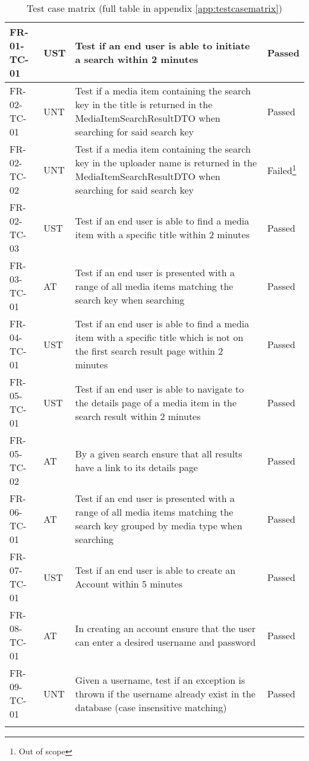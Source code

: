 \documentclass[../report.tex]{subfiles}
\begin{document}
\begin{longtable}{|L{2.1cm}|L{0.8cm}|L{9cm}|L{1.2cm}|}
FR-01-TC-01 & UST & Test if an end user is able to initiate a search within 2 minutes & Passed  \\ \hline
FR-02-TC-01& UNT& Test if a media item containing the search key in the title is returned in the MediaItemSearchResultDTO when searching for said search key& Passed  \\ \hline
FR-02-TC-02& UNT& Test if a media item containing the search key in the uploader name is returned in the MediaItemSearchResultDTO when searching for said search key& Failed\footnote{Out of scope}  \\ \hline
FR-02-TC-03&UST&Test if an end user is able to find a media item with a specific title within 2 minutes&Passed  \\ \hline
FR-03-TC-01&AT&Test if an end user is presented with a range of all media items matching the search key when searching &Passed  \\ \hline
FR-04-TC-01&UST&Test if an end user is able to find a media item with a specific title which is not on the first search result page within 2 minutes&Passed  \\ \hline
FR-05-TC-01&UST&Test if an end user is able to navigate to the details page of a media item in the search result within 2 minutes&Passed  \\ \hline
FR-05-TC-02&AT&By a given search ensure that all results have a link to its details page&Passed  \\ \hline
FR-06-TC-01&AT&Test if an end user is presented with a range of all media items matching the search key grouped by media type when searching &Passed  \\ \hline
FR-07-TC-01&UST&Test if an end user is able to create an Account within 5 minutes&Passed  \\ \hline
FR-08-TC-01&AT&In creating an account ensure that the user can enter a desired username and password&Passed  \\ \hline
FR-09-TC-01&UNT&Given a username, test if an exception is thrown if the username already exist in the database (case insensitive matching)&Passed  \\ \hline

\captionsetup{belowskip=10pt}

\caption{\label{tab:testcasematrix} Test case matrix (full table in appendix \ref{app:testcasematrix})}

\end{longtable}
\end{document}
